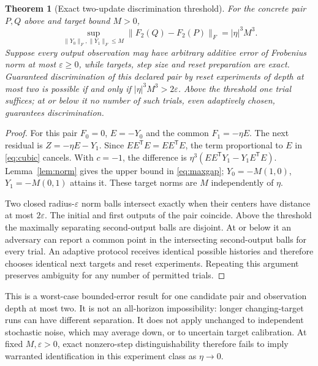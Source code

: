 \documentclass[11pt]{article}
\newtheorem{theorem}{Theorem}[section]
\theoremstyle{remark}\newtheorem{remark}[theorem]{Remark}
\begin{document}
\begin{theorem}[Exact two-update discrimination threshold]\label{thm:noise}
For the concrete pair $P,Q$ above and target bound $M>0$,
\begin{equation}\label{eq:maxgap}
 \sup_{\|Y_0\|_F,\|Y_1\|_F\leq M}
     \|F_2(Q)-F_2(P)\|_F=|\eta|^3M^3.
\end{equation}
Suppose every output observation may have arbitrary additive error of
Frobenius norm at most $\varepsilon\geq0$, while targets, step size and
reset preparation are exact. Guaranteed discrimination of this declared
pair by reset experiments of depth at most two is possible if and only if
$|\eta|^3M^3>2\varepsilon$. Above the threshold one trial suffices;
at or below it no number of such trials, even adaptively chosen, guarantees
discrimination.
\end{theorem}
\begin{proof}
For this pair $F_0=0$, $E=-Y_0$ and the common $F_1=-\eta E$.
The next residual is $Z=-\eta E-Y_1$.
Since $EE^{\mathsf T}E=EE^{\mathsf T}E$, the term proportional to $E$
in \eqref{eq:cubic} cancels. With $c=-1$, the difference is
$\eta^3(EE^{\mathsf T}Y_1-Y_1E^{\mathsf T}E)$.
Lemma~\ref{lem:norm} gives the upper bound in \eqref{eq:maxgap};
$Y_0=-M(1,0)$, $Y_1=-M(0,1)$ attains it. These target norms are $M$
independently of $\eta$.

Two closed radius-$\varepsilon$ norm balls intersect exactly when their
centers have distance at most $2\varepsilon$. The initial and first
outputs of the pair coincide. Above the threshold the maximally separating
second-output balls are disjoint. At or below it an adversary can report
a common point in the intersecting second-output balls for every trial.
An adaptive protocol receives identical possible histories and therefore
chooses identical next targets and reset experiments. Repeating this
argument preserves ambiguity for any number of permitted trials.
\end{proof}
This is a worst-case bounded-error result for one candidate pair and
observation depth at most two. It is not an all-horizon impossibility:
longer changing-target runs can have different separation. It does not
apply unchanged to independent stochastic noise, which may average down,
or to uncertain target calibration. At fixed $M,\varepsilon>0$, exact
nonzero-step distinguishability therefore fails to imply warranted
identification in this experiment class as $\eta\to0$.
\end{document}
